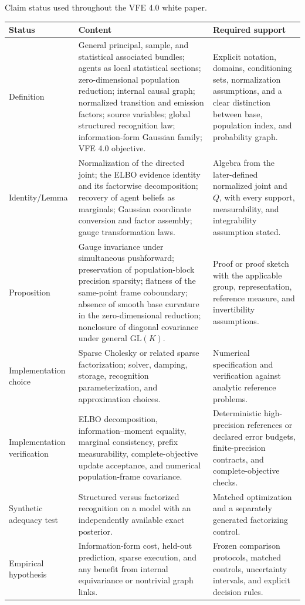 \begin{sciencetable}{Claim status used throughout the VFE 4.0 white paper.}
\label{tab:claim-status}
\begin{tabularx}{\textwidth}{>{\raggedright\arraybackslash}p{} >{\raggedright\arraybackslash}X >{\raggedright\arraybackslash}p{}}
\toprule
\textbf{Status} & \textbf{Content} & \textbf{Required support} \\
\midrule
Definition & General principal, sample, and statistical associated bundles; agents as local statistical sections; zero-dimensional population reduction; internal causal graph; normalized transition and emission factors; source variables; global structured recognition law; information-form Gaussian family; VFE 4.0 objective. & Explicit notation, domains, conditioning sets, normalization assumptions, and a clear distinction between base, population index, and probability graph. \\
\addlinespace
Identity/Lemma & Normalization of the directed joint; the ELBO evidence identity and its factorwise decomposition; recovery of agent beliefs as marginals; Gaussian coordinate conversion and factor assembly; gauge transformation laws. & Algebra from the later-defined normalized joint and \(Q\), with every support, measurability, and integrability assumption stated. \\
\addlinespace
Proposition & Gauge invariance under simultaneous pushforward; preservation of population-block precision sparsity; flatness of the same-point frame coboundary; absence of smooth base curvature in the zero-dimensional reduction; nonclosure of diagonal covariance under general \(\mathrm{GL}(K)\). & Proof or proof sketch with the applicable group, representation, reference measure, and invertibility assumptions. \\
\addlinespace
Implementation choice & Sparse Cholesky or related sparse factorization; solver, damping, storage, recognition parameterization, and approximation choices. & Numerical specification and verification against analytic reference problems. \\
\addlinespace
Implementation verification & ELBO decomposition, information--moment equality, marginal consistency, prefix measurability, complete-objective update acceptance, and numerical population-frame covariance. & Deterministic high-precision references or declared error budgets, finite-precision contracts, and complete-objective checks. \\
\addlinespace
Synthetic adequacy test & Structured versus factorized recognition on a model with an independently available exact posterior. & Matched optimization and a separately generated factorizing control. \\
\addlinespace
Empirical hypothesis & Information-form cost, held-out prediction, sparse execution, and any benefit from internal equivariance or nontrivial graph links. & Frozen comparison protocols, matched controls, uncertainty intervals, and explicit decision rules. \\
\bottomrule
\end{tabularx}
\end{sciencetable}

